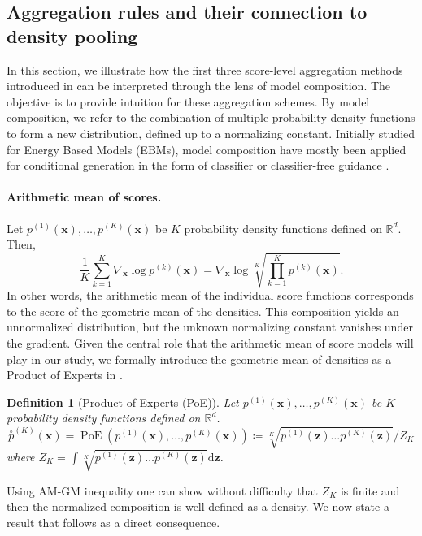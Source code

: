 \documentclass[10pt]{article} %
\DeclareMathOperator{\PoE}{PoE}
\newtheorem{definition}{Definition}[section]
\def\rvx{{\mathbf{x}}}
\def\rvz{{\mathbf{z}}}
\newcommand{\geo}[1]{\overset{\circ}{#1}}
\begin{document}
\subsection{Aggregation rules and their connection to density pooling}\label{app: combination rules}
In this section, we illustrate how the first three score-level aggregation methods introduced in  can be interpreted through the lens of model composition. The objective is to provide intuition for these aggregation schemes. By model composition, we refer to the combination of multiple probability density functions to form a new distribution, defined up to a normalizing constant. Initially studied for Energy Based Models (EBMs), model composition have mostly been applied for conditional generation in the form of classifier or classifier-free guidance \citep{du2023reducereuserecyclecompositional, skreta2024superposition, skreta2025feynman}. 

\paragraph{Arithmetic mean of scores.}  
Let $p^{(1)}(\rvx), \dots, p^{(K)}(\rvx)$ be $K$ probability density functions defined on $\mathbb{R}^d$. Then,
\begin{equation}
\frac{1}{K} \sum_{k=1}^K \nabla_{\rvx} \log p^{(k)}(\rvx) = \nabla_\rvx \log \sqrt[K]{\prod_{k=1}^K p^{(k)}(\rvx)}.
\end{equation}
In other words, the arithmetic mean of the individual score functions corresponds to the score of the geometric mean of the densities. This composition yields an unnormalized distribution, but the unknown normalizing constant vanishes under the gradient. Given the central role that the arithmetic mean of score models will play in our study, we formally introduce the geometric mean of densities as a Product of Experts in .
\begin{definition}[Product of Experts (PoE)]\label{definition: PoE}
Let $p^{(1)}(\rvx), \dots, p^{(K)}(\rvx)$ be $K$ probability density functions defined on $\mathbb{R}^d$.
\begin{equation}\geo{p}^{(K)}(\rvx) = \PoE(p^{(1)}(\rvx),\dots,p^{(K)}(\rvx)) \coloneqq \sqrt[K\,]{p^{(1)}(\rvz) \dots p^{(K)}(\rvz)}/ Z_K\end{equation}
where  $Z_K = {\int} \sqrt[K\,]{p^{(1)}(\rvz) \dots p^{(K)}(\rvz)} \mathrm{d}\rvz$.
\end{definition}
Using AM-GM inequality one can show without difficulty that $Z_K$ is finite and then the normalized composition is well-defined as a density. We now state a result that follows as a direct consequence.
\end{document}
